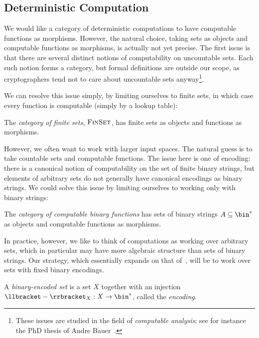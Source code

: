 \subsection{Deterministic Computation}

We would like a category of deterministic computations to have computable
functions as morphisms. However, the natural choice, taking sets as objects and
computable functions as morphisms, is actually not yet precise. The first issue
is that there are several distinct notions of computability on uncountable sets.
Each such notion forms a category, but formal definitions are outside our scope,
as cryptographers tend not to care about uncountable sets anyway\footnote{These
issues are studied in the field of \emph{computable analysis}; see for instance
the PhD thesis of Andre Bauer~\cite{bauer-2000}.}.

We can resolve this issue simply, by limiting ourselves to finite sets, in which
case every function is computable (simply by a lookup table):

\begin{dfn}
  The \emph{category of finite sets}, ${\textsc{\text{FinSet}}}$, has finite sets as
  objects and functions as morphisms.
\end{dfn}

However, we often want to work with larger input spaces. The natural guess is to
take countable sets and computable functions. The issue here is one of encoding:
there is a canonical notion of computability on the set of finite binary
strings, but elements of arbitrary sets do not generally have canonical
encodings as binary strings. We could solve this issue by limiting
ourselves to working only with binary strings:
\begin{dfn}
  The \emph{category of computable binary functions}  has sets of binary strings
  $A\subseteq\bin^*$ as objects and computable functions as morphisms.
\end{dfn}

In practice, however, we like to think of computations as working over arbitrary
sets, which in particular may have more algebraic structure than sets of binary
strings. Our strategy, which essentially expands on that
of~\cite{pavlovic-2014}, will be to work over sets with fixed binary encodings.
\begin{dfn}
  A \emph{binary-encoded set} is a set $X$ together with an injection
  $\denote{-}_X: X\to\bin^*$, called the \emph{encoding}.
\end{dfn}

